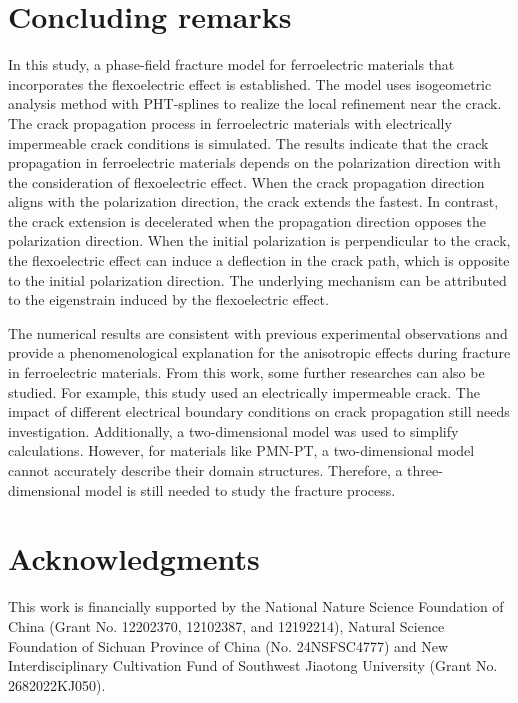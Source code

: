 \documentclass[final,times,fleqn,11pt]{elsarticle}
\begin{document}
\section{Concluding remarks}\label{Section5}
In this study, a phase-field fracture model for ferroelectric materials that incorporates the flexoelectric effect is established. The model uses isogeometric analysis method with PHT-splines to realize the local refinement near the crack. The crack propagation process in ferroelectric materials with electrically impermeable crack conditions is simulated. The results indicate that the crack propagation in ferroelectric materials depends on the polarization direction with the consideration of flexoelectric effect. When the crack propagation direction aligns with the polarization direction, the crack extends the fastest. In contrast, the crack extension is decelerated when the propagation direction opposes the polarization direction. When the initial polarization is perpendicular to the crack, the flexoelectric effect can induce a deflection in the crack path, which is opposite to the initial polarization direction. The underlying mechanism can be attributed to the eigenstrain induced by the flexoelectric effect.

The numerical results are consistent with previous experimental observations  and  provide a phenomenological explanation for the anisotropic effects during fracture in ferroelectric materials. From this work, some further researches can also be studied. For example, this study used an electrically impermeable crack. The impact of different electrical boundary conditions on crack propagation still needs investigation. Additionally, a two-dimensional model was used to simplify calculations. However, for materials like PMN-PT, a two-dimensional model cannot accurately describe their domain structures. Therefore, a three-dimensional model is still needed to study the fracture process.

\section*{Acknowledgments}
This work is financially supported by the National Nature Science Foundation of China (Grant No. 12202370, 12102387, and 12192214), Natural Science Foundation of Sichuan Province of China (No. 24NSFSC4777) and New Interdisciplinary Cultivation Fund of Southwest Jiaotong University (Grant No. 2682022KJ050).

\appendix




\end{document}
